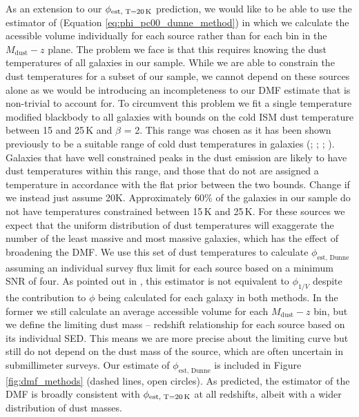 As an extension to our $\phi_{\textrm{est, T=20\,K}}$ prediction, we would like to be able to use the estimator of \citealt{Dunne_2011} (Equation \ref{eq:phi_pc00_dunne_method}) in which we calculate the acessible volume individually for each source rather than for each bin in the $M_{\textrm{dust}} - z$ plane. The problem we face is that this requires knowing the dust temperatures of all galaxies in our sample. While we are able to constrain the dust temperatures for a subset of our sample, we cannot depend on these sources alone as we would be introducing an incompleteness to our DMF estimate that is non-trivial to account for. To circumvent this problem we fit a single temperature modified blackbody to all galaxies with bounds on the cold ISM dust temperature between 15 and 25\,K and $\beta$ = 2. This range was chosen as it has been shown previously to be a suitable range of cold dust temperatures in galaxies (\citealt{Dunne_2001}; \citealt{Smith_2012b}; \citealt{Clark_2015}; \citealt{Beeston_2018}). Galaxies that have well constrained peaks in the dust emission are likely to have dust temperatures within this range, and those that do not are assigned a temperature in accordance with the flat prior between the two bounds. {\color{red}Change if we instead just assume 20K.} Approximately 60\% of the galaxies in our sample do not have temperatures constrained between 15\,K and 25\,K. For these sources we expect that the uniform distribution of dust temperatures will exaggerate the number of the least massive and most massive galaxies, which has the effect of broadening the DMF. We use this set of dust temperatures to calculate $\phi_{\textrm{est, Dunne}}$ assuming an individual survey flux limit for each source based on a minimum SNR of four. As pointed out in \citealt{Dunne_2011}, this estimator is not equivalent to $\phi_{1/V}$ despite the contribution to $\phi$ being calculated for each galaxy in both methods. In the former we still calculate an average accessible volume for each $M_{\textrm{dust}} - z$ bin, but we define the limiting dust mass -- redshift relationship for each source based on its individual SED. This means we are more precise about the limiting curve but still do not depend on the dust mass of the source, which are often uncertain in submillimeter surveys. Our estimate of $\phi_{\textrm{est, Dunne}}$ is included in Figure \ref{fig:dmf_methods} (dashed lines, open circles). As predicted, the \citealt{Dunne_2011} estimator of the DMF is broadly consistent with $\phi_{\textrm{est, T=20\,K}}$ at all redshifts, albeit with a wider distribution of dust masses. 


